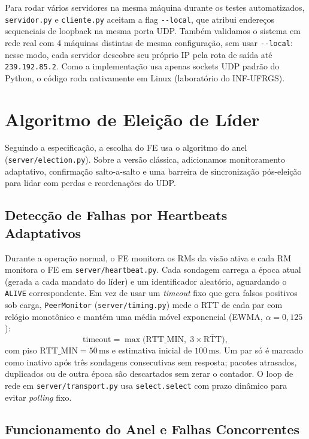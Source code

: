 \documentclass[12pt]{article}
\begin{document}
Para rodar vários servidores na mesma máquina durante os testes automatizados, \texttt{servidor.py} e \texttt{cliente.py} aceitam a flag \texttt{-{-}local}, que atribui endereços sequenciais de loopback na mesma porta UDP. Também validamos o sistema em rede real com 4 máquinas distintas de mesma configuração, sem usar \texttt{-{-}local}: nesse modo, cada servidor descobre seu próprio IP pela rota de saída até \texttt{239.192.85.2}. Como a implementação usa apenas sockets UDP padrão do Python, o código roda nativamente em Linux (laboratório do INF-UFRGS).

\section{Algoritmo de Eleição de Líder}

Seguindo a especificação, a escolha do FE usa o algoritmo do anel (\texttt{server/election.py}). Sobre a versão clássica, adicionamos monitoramento adaptativo, confirmação salto-a-salto e uma barreira de sincronização pós-eleição para lidar com perdas e reordenações do UDP.

\subsection{Detecção de Falhas por Heartbeats Adaptativos}

Durante a operação normal, o FE monitora os RMs da visão ativa e cada RM monitora o FE em \texttt{server/heartbeat.py}. Cada sondagem carrega a época atual (gerada a cada mandato do líder) e um identificador aleatório, aguardando o \texttt{ALIVE} correspondente. Em vez de usar um \textit{timeout} fixo que gera falsos positivos sob carga, \texttt{PeerMonitor} (\texttt{server/timing.py}) mede o RTT de cada par com relógio monotônico e mantém uma média móvel exponencial (EWMA, $\alpha = 0{,}125$):
\[
    \text{timeout} = \max\bigl(\text{RTT\_MIN},\; 3 \times \overline{\text{RTT}}\bigr),
\]
com piso $\text{RTT\_MIN} = 50\,\text{ms}$ e estimativa inicial de $100\,\text{ms}$. Um par só é marcado como inativo após três sondagens consecutivas sem resposta; pacotes atrasados, duplicados ou de outra época são descartados sem zerar o contador. O loop de rede em \texttt{server/transport.py} usa \texttt{select.select} com prazo dinâmico para evitar \textit{polling} fixo.

\subsection{Funcionamento do Anel e Falhas Concorrentes}
\end{document}
